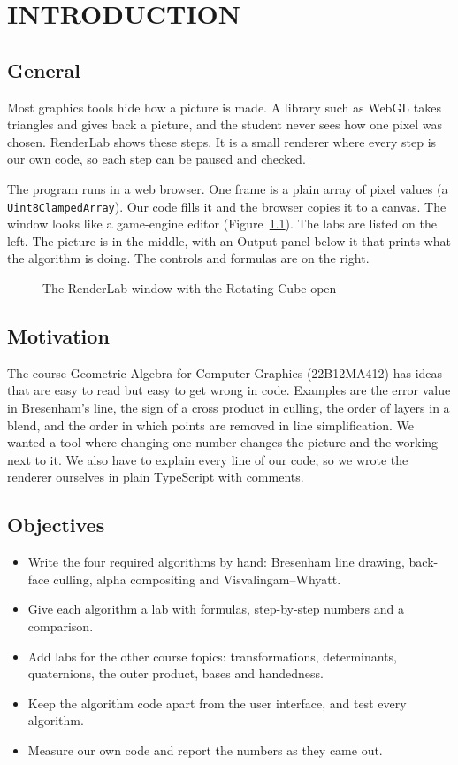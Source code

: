 \chapter{INTRODUCTION}\nonum

\section{General}
Most graphics tools hide how a picture is made. A library such as WebGL takes triangles and gives back a picture, and the student never sees how one pixel was chosen. RenderLab shows these steps. It is a small renderer where every step is our own code, so each step can be paused and checked.

The program runs in a web browser. One frame is a plain array of pixel values (a \texttt{Uint8ClampedArray}). Our code fills it and the browser copies it to a canvas. The window looks like a game-engine editor (Figure~\ref{fig:shell}). The labs are listed on the left. The picture is in the middle, with an Output panel below it that prints what the algorithm is doing. The controls and formulas are on the right.

\begin{figure}[H]
\centering
{}
\caption{The RenderLab window with the Rotating Cube open}
\label{fig:shell}
\end{figure}

\section{Motivation}
The course Geometric Algebra for Computer Graphics (22B12MA412) has ideas that are easy to read but easy to get wrong in code. Examples are the error value in Bresenham's line, the sign of a cross product in culling, the order of layers in a blend, and the order in which points are removed in line simplification. We wanted a tool where changing one number changes the picture and the working next to it. We also have to explain every line of our code, so we wrote the renderer ourselves in plain TypeScript with comments.

\section{Objectives}
\begin{itemize}
\item Write the four required algorithms by hand: Bresenham line drawing, back-face culling, alpha compositing and Visvalingam--Whyatt.
\item Give each algorithm a lab with formulas, step-by-step numbers and a comparison.
\item Add labs for the other course topics: transformations, determinants, quaternions, the outer product, bases and handedness.
\item Keep the algorithm code apart from the user interface, and test every algorithm.
\item Measure our own code and report the numbers as they came out.
\end{itemize}

